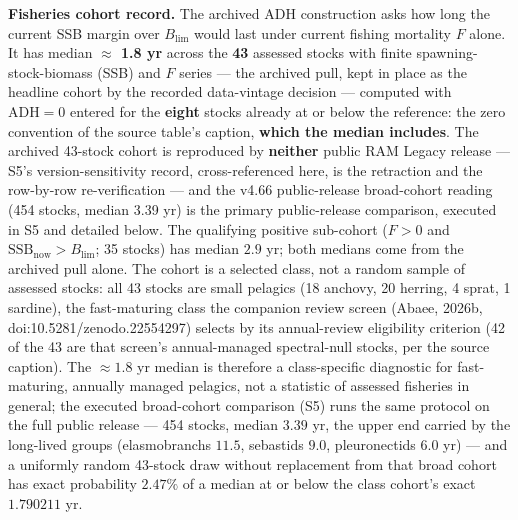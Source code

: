 \documentclass[11pt]{article}
\begin{document}
\textbf{Fisheries cohort record.} The archived ADH construction asks how long the current SSB margin over \(B_{\lim}\) would last under current fishing mortality \(F\) alone. It has median \textbf{\ensuremath{\approx} 1.8 yr} across the \textbf{43} assessed stocks with finite spawning-stock-biomass (SSB) and \(F\) series --- the archived pull, kept in place as the headline cohort by the recorded data-vintage decision --- computed with \(\mathrm{ADH}=0\) entered for the \textbf{eight} stocks already at or below the reference: the zero convention of the source table's caption, \textbf{which the median includes}. The archived 43-stock cohort is reproduced by \textbf{neither} public RAM Legacy release --- S5's version-sensitivity record, cross-referenced here, is the retraction and the row-by-row re-verification --- and the v4.66 public-release broad-cohort reading (454 stocks, median 3.39 yr) is the primary public-release comparison, executed in S5 and detailed below. The qualifying positive sub-cohort (\(F > 0\) and \(\mathrm{SSB}_{\mathrm{now}} > B_{\lim}\); 35 stocks) has median \(2.9\) yr; both medians come from the archived pull alone. The cohort is a selected class, not a random sample of assessed stocks: all 43 stocks are small pelagics (18 anchovy, 20 herring, 4 sprat, 1 sardine), the fast-maturing class the companion review screen (Abaee, 2026b, doi:10.5281/\allowbreak{}zenodo.22554297) selects by its annual-review eligibility criterion (42 of the 43 are that screen's annual-managed spectral-null stocks, per the source caption). The \(\approx 1.8\) yr median is therefore a class-specific diagnostic for fast-maturing, annually managed pelagics, not a statistic of assessed fisheries in general; the executed broad-cohort comparison (S5) runs the same protocol on the full public release --- 454 stocks, median \(3.39\) yr, the upper end carried by the long-lived groups (elasmobranchs \(11.5\), sebastids \(9.0\), pleuronectids \(6.0\) yr) --- and a uniformly random 43-stock draw without replacement from that broad cohort has exact probability \(2.47\%\) of a median at or below the class cohort's exact \(1.790211\) yr.
\end{document}
